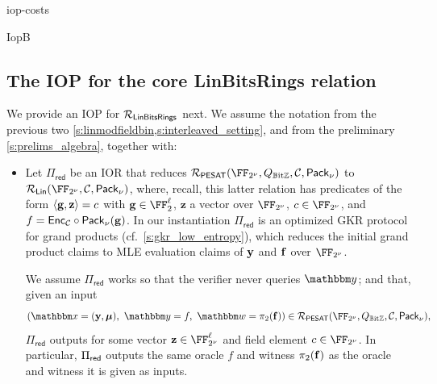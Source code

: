 \begin{lncsappendix}{iop-costs}
\begin{lncsmove}{IopB}
\subsection{The {\ftwoz} IOP for the core LinBitsRings relation}\label{s:core_iop}

We provide an IOP for $\mathcal{R}_{\mathsf{LinBitsRings}}$ next. We assume the notation from the previous two \cref{s:linmodfieldbin,s:interleaved_setting}, and from the preliminary \cref{s:prelims_algebra}, together with:
\renewcommand{\evalfield}{R}
\iflncs\else\begin{itemize}[leftmargin=*]\fi








\iflncs\else\item\fi{} 
Let $\Pi_{\mathsf{red}}$ be an IOR  that reduces 
%
$
\PESAT(\comfield, Q_{\mathbb{B}\text{it}\ZZ},\cC, \pack)$ to $\LIN(\comfield, \cC, \pack)$, where, recall, this latter relation has predicates of the form $\langle \mathbf{g}, \mathbf{z}\rangle = c$ with $\bfg\in \FF_2^{\codedim}$, $\mathbf{z}$ a vector over $\comfield$, $c\in \comfield$, and $f=\mathsf{Enc}_{\mathcal{C}}\circ \mathsf{Pack}_\nu(\mathbf{g})$.   In our instantiation $\Pi_{\mathsf{red}}$ is an optimized GKR protocol for  grand products (cf.\ \cref{s:gkr_low_entropy}), which reduces the initial grand product claims to MLE evaluation claims of $\mathbf{y}$ and $\mathbf{f}$ over $\comfield$.

%
%
We assume $\Pi_{\mathsf{red}}$ works so that the verifier never queries $\oracle$; and that, given an input
%
$$\left(\inp=(\yy,\bm{\mu}),\  \oracle= f, \ \wit=\picomfield(\bff)\right)\in \PESAT(\comfield, Q_{\mathbb{B}\text{it}\ZZ},\cC, \pack),$$
%
$\Pi_{\mathsf{red}}$ outputs
%
 for some vector $\mathbf{z}\in \comfield^{\codedim}$ and field element $c\in \comfield$. In particular, $\Pi_{\mathsf{red}}$ outputs the same oracle $f$ and witness $\pi_2(\mathbf{f})$ as the oracle and witness it is given as inputs. 


\end{itemize}
\end{lncsmove}
\end{lncsappendix}
